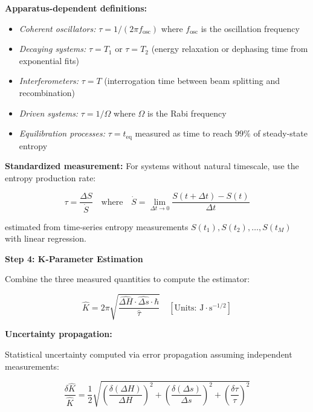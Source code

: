 \documentclass[11pt,a4paper,twoside]{article}
\begin{document}
\begin{tcolorbox}[colback=blue!5!white,colframe=blue!75!black,title=\textbf{K-Parameter Estimator Pipeline}]
\textbf{Apparatus-dependent definitions:}
\begin{itemize}[leftmargin=*]
    \item \textit{Coherent oscillators:} $\tau = 1/(2\pi f_{\text{osc}})$ where $f_{\text{osc}}$ is the oscillation frequency
    \item \textit{Decaying systems:} $\tau = T_1$ or $\tau = T_2$ (energy relaxation or dephasing time from exponential fits)
    \item \textit{Interferometers:} $\tau = T$ (interrogation time between beam splitting and recombination)
    \item \textit{Driven systems:} $\tau = 1/\Omega$ where $\Omega$ is the Rabi frequency
    \item \textit{Equilibration processes:} $\tau = t_{\text{eq}}$ measured as time to reach $99\%$ of steady-state entropy
\end{itemize}

\textbf{Standardized measurement:} For systems without natural timescale, use the entropy production rate:

\begin{equation}
\tau = \frac{\Delta S}{\dot{S}} \quad \text{where} \quad \dot{S} = \lim_{\Delta t \to 0}\frac{S(t+\Delta t) - S(t)}{\Delta t}
\end{equation}

estimated from time-series entropy measurements $S(t_1), S(t_2), \ldots, S(t_M)$ with linear regression.

\textbf{Step 4: K-Parameter Estimation}

Combine the three measured quantities to compute the estimator:

\begin{equation}
\boxed{\hat{K} = 2\pi\sqrt{\frac{\widehat{\Delta H} \cdot \widehat{\Delta s} \cdot \hbar}{\hat{\tau}}} \quad [\text{Units: J} \cdot \text{s}^{-1/2}]}
\end{equation}

\textbf{Uncertainty propagation:}

Statistical uncertainty computed via error propagation assuming independent measurements:

\begin{equation}
\frac{\delta \hat{K}}{\hat{K}} = \frac{1}{2}\sqrt{\left(\frac{\delta(\Delta H)}{\Delta H}\right)^2 + \left(\frac{\delta(\Delta s)}{\Delta s}\right)^2 + \left(\frac{\delta \tau}{\tau}\right)^2}
\end{equation}


\end{tcolorbox}
\end{document}

